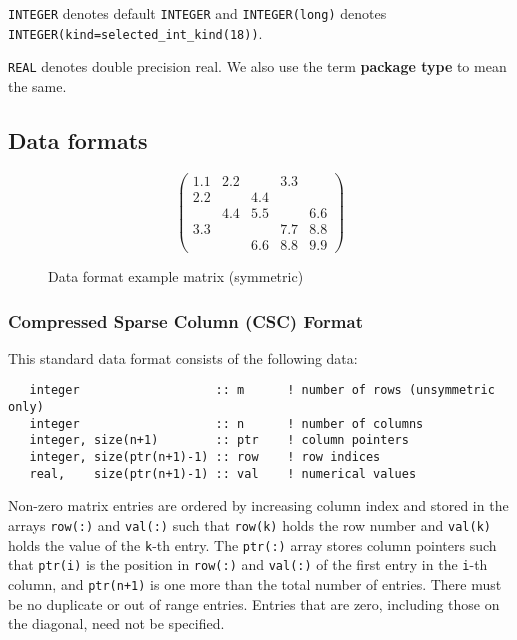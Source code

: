 {\tt INTEGER} denotes default {\tt INTEGER} and
{\tt INTEGER(long)} denotes {\tt INTEGER(kind=selected\_int\_kind(18))}.

\noindent
{\tt REAL} denotes double precision real.
We also use the term {\bf package type} to mean the same.

\subsection{Data formats} \label{dataformats}

\begin{figure}
   \caption{ \label{format eg}
      Data format example matrix (symmetric)
   }
   $$
      \left( \begin{array}{ccccc}
         1.1 & 2.2 &     & 3.3 &     \\
         2.2 &     & 4.4 &     &     \\
             & 4.4 & 5.5 &     & 6.6 \\
         3.3 &     &     & 7.7 & 8.8 \\
             &     & 6.6 & 8.8 & 9.9
      \end{array} \right)
   $$
\end{figure}

\subsubsection{Compressed Sparse Column (CSC) Format} \label{cscformat}
This standard data format consists of the following data:
\begin{verbatim}
   integer                   :: m      ! number of rows (unsymmetric only)
   integer                   :: n      ! number of columns
   integer, size(n+1)        :: ptr    ! column pointers
   integer, size(ptr(n+1)-1) :: row    ! row indices
   real,    size(ptr(n+1)-1) :: val    ! numerical values
\end{verbatim}
Non-zero matrix entries are ordered by increasing column index and stored in
the arrays \texttt{row(:)} and \texttt{val(:)} such that \texttt{row(k)} holds
the row number and \texttt{val(k)} holds the value of the \texttt{k}-th entry.
The \texttt{ptr(:)} array stores column pointers such that \texttt{ptr(i)} is
the position in \texttt{row(:)} and \texttt{val(:)} of
the first entry in the \texttt{i}-th column, and \texttt{ptr(n+1)} is one more
than the total number of entries. There must be no duplicate or out of range
entries.
Entries that are zero, including those on the diagonal, need not be specified.

